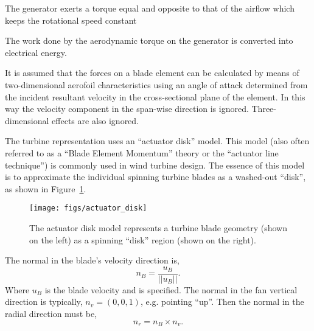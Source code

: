 The generator exerts a torque equal and opposite to that of the airflow
which keeps the rotational speed constant

 The work done by the aerodynamic torque on the
generator is converted into electrical energy.

It is assumed that the forces on a blade element can be calculated by
means of two-dimensional aerofoil characteristics using an angle of
attack determined from the incident resultant velocity in the
cross-sectional plane of the element. In this way the velocity component
in the span-wise direction is ignored. Three-dimensional effects are
also ignored\cite{burton2001wind}. 

The turbine representation uses an ``actuator disk'' model. This model
(also often referred to as a ``Blade Element Momentum'' theory or the
``actuator line technique'') is commonly used in wind turbine
design\cite{shevell1983fundamentals,betz,leclerc}. The essence of this
model is to approximate the individual spinning turbine blades as a
washed-out ``disk'', as shown in Figure~\ref{fig:actuator_disk}.  

   \begin{figure}[!htb]
    \centering
    \texttt{[image: figs/actuator\_disk]}
     \caption{The actuator disk model represents a turbine blade
    geometry (shown on the left) as a spinning ``disk'' region (shown
    on the right).}
     \label{fig:actuator_disk}
   \end{figure}

The normal in the blade's velocity direction is,
\begin{equation*}
n_B = \frac{u_B}{||u_B||}. 
\end{equation*}
Where $u_B$ is the blade velocity and is specified. The normal in the
fan vertical direction is typically, $n_v = \left(0,0,1\right)$, 
e.g. pointing ``up''. Then the normal in the radial direction must be, 
\begin{equation*}
n_r = n_B \times n_v. 
\end{equation*}



